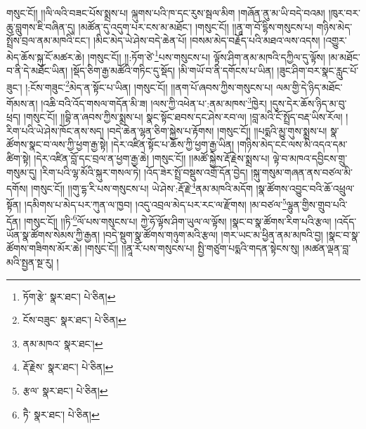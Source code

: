 གསུང་ངོ།། །།ལི་ལའི་བཟང་པོས་སྨྲས་པ། ལྐུགས་པའི་ཁ་དང་རུས་སྦལ་མིག །གཞོན་ནུ་མ་ཡི་བདེ་བའམ། །ཁུར་བར་ཆུ་བླུགས་ཇི་བཞིན་དུ། །མཚོན་དུ་འདུག་པར་ངས་མ་མཐོང་། །གསུང་ངོ།། །།ནཱ་ག་བོ་དྷིས་གསུངས་པ། གཉིས་མེད་སྤྲོས་བྲལ་ནམ་མཁའི་ངང་། །མིང་མེད་ཡེ་ཤེས་བདེ་ཆེན་པོ། །བསམ་མེད་བརྗོད་པའི་མཐའ་ལས་འདས། །འགྱུར་མེད་ཆོས་སྐུ་ངོ་མཚར་ཆེ། །གསུང་ངོ།། །།:ཏོག་ཙེ་\footnote{ཏོག་རྩེ་  སྣར་ཐང་།  པེ་ཅིན། }པས་གསུངས་པ། ལྟོས་ཤིག་ནམ་མཁའི་དཀྱིལ་དུ་ལྟོས། །མ་མཐོང་བ་ནི་དེ་མཐོང་ཡིན། །སྡོད་ཅིག་རྒྱ་མཚོའི་གཏིང་དུ་སྡོད། །མི་གཡོ་བ་ནི་དགོངས་པ་ཡིན། །ཟུང་ཤིག་བར་སྣང་རླུང་པོ་ཟུང་། །:ངོས་གཟུང་\footnote{ངོས་བཟུང་  སྣར་ཐང་།  པེ་ཅིན། }མེད་ན་སྟོང་པ་ཡིན། །གསུང་ངོ།། །།ནག་པོ་ཞབས་ཀྱིས་གསུངས་པ། ལམ་གྱི་དེ་ཉིད་མཐོང་གོམས་ན། །འཆི་བའི་འོད་གསལ་གདོན་མི་ཟ། །ལས་ཀྱི་འཕེན་པ་:ནམ་མཁས་\footnote{ནམ་མཁའ་  སྣར་ཐང་། }ཁྱེར། །དུས་དེར་ཆོས་ཉིད་མ་བུ་ཕྲད། །གསུང་ངོ།། །།བྷི་ན་ཞབས་ཀྱིས་སྨྲས་པ། སྣང་སྟོང་ཐབས་དང་ཤེས་རབ་ལ། །བླ་མའི་ངོ་སྤྲོད་བརྡ་ཡིས་རོལ། །རིག་པའི་ཡེ་ཤེས་ཁོང་ནས་སད། །བདེ་ཆེན་ལྷན་ཅིག་སྐྱེས་པ་རྟོགས། །གསུང་ངོ།། །།པདྨའི་མྱུ་གུས་སྨྲས་པ། སྣ་ཚོགས་སྣང་བ་ལས་ཀྱི་ཕྱག་རྒྱ་སྟེ། །དེར་འཛིན་སྟོང་པ་ཆོས་ཀྱི་ཕྱག་རྒྱ་ཡིན། །གཉིས་མེད་ངང་ལས་མི་འདའ་དམ་ཚིག་སྟེ། །དེར་འཛིན་བློ་དང་བྲལ་ན་ཕྱག་རྒྱ་ཆེ། །གསུང་ངོ།། །།མཚོ་སྐྱེས་རྡོ་རྗེས་སྨྲས་པ། ལྟེ་བ་མཁའ་དབྱིངས་གྲུ་གསུམ་དུ། །རིག་པའི་ལྷ་མོའི་སྐུར་གསལ་ཏེ། །འོད་ཟེར་སྤྲོ་བསྡུས་འགྲོ་དོན་བྱེད། །སྐུ་གསུམ་གཞན་ནས་བཙལ་མི་དགོས། །གསུང་ངོ།། །།གུ་དྷ་རི་པས་གསུངས་པ། ཡེ་ཤེས་:རྡོ་རྗེ་\footnote{རྡོ་རྗེས་  སྣར་ཐང་།  པེ་ཅིན། }ནམ་མཁའི་མདོག །སྣ་ཚོགས་འབྱུང་བའི་ཆོ་འཕྲུལ་སྟོན། །དམིགས་པ་མེད་པར་ཀུན་ལ་ཁྱབ། །འདུ་འབྲལ་མེད་པར་རང་ལ་རྫོགས། །མ་བཙལ་\footnote{རྩལ་  སྣར་ཐང་།  པེ་ཅིན། }ལྷུན་གྱིས་གྲུབ་པའི་དོན། །གསུང་ངོ།། །།ཏི་\footnote{ཏཻ་  སྣར་ཐང་།  པེ་ཅིན། }ལོ་པས་གསུངས་པ། ཀྱེ་ཧོ་ལྟོས་ཤིག་ཡུལ་ལ་ལྟོས། །སྣང་བ་སྣ་ཚོགས་རིག་པའི་རྩལ། །འདོད་ཡོན་སྣ་ཚོགས་སེམས་ཀྱི་རྒྱན། །བདེ་སྡུག་སྣ་ཚོགས་གཉུག་མའི་རྩལ། །གར་ཡང་མ་ཕྱིན་ནམ་མཁའི་བྱ། །སྣང་བ་སྣ་ཚོགས་གཟིགས་མོར་ཆེ། །གསུང་ངོ།། །།ནཱ་རོ་པས་གསུངས་པ། སྤྱི་གཙུག་པདྨའི་གདན་སྟེངས་སུ། །མཚན་ལྡན་བླ་མའི་སྤྱན་སྔ་རུ། །

